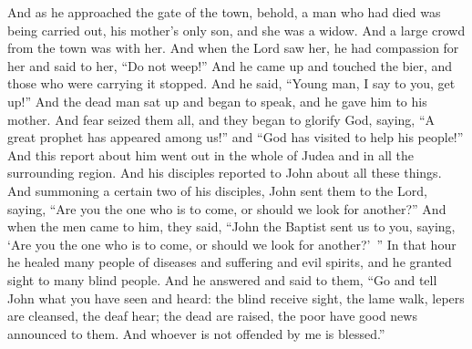 \begin{biblechapter}
\verse And as he approached the gate of the town, behold, a man who had died was being carried out, his mother’s only son, and she was a widow. And a large crowd from the town was with her.
\verse And when the Lord saw her, he had compassion for her and said to her, “Do not weep!”
\verse And he came up and touched the bier, and those who were carrying it stopped. And he said, “Young man, I say to you, get up!”
\verse And the dead man sat up and began to speak, and he gave him to his mother.
\verse And fear seized them all, and they began to glorify God, saying, “A great prophet has appeared among us!” and “God has visited to help his people!”
\verse And this report about him went out in the whole of Judea and in all the surrounding region.
 And his disciples reported to John about all these things. And summoning a certain two of his disciples, John
\verse sent them to the Lord, saying, “Are you the one who is to come, or should we look for another?”
\verse And when the men came to him, they said, “John the Baptist sent us to you, saying, ‘Are you the one who is to come, or should we look for another?’ ”
\verse In that hour he healed many people of diseases and suffering and evil spirits, and he granted sight to many blind people.
\verse And he answered and said to them, “Go and tell John what you have seen and heard: the blind receive sight, the lame walk, lepers are cleansed, the deaf hear; the dead are raised, the poor have good news announced to them.
\verse And whoever is not offended by me is blessed.”

\end{biblechapter}
